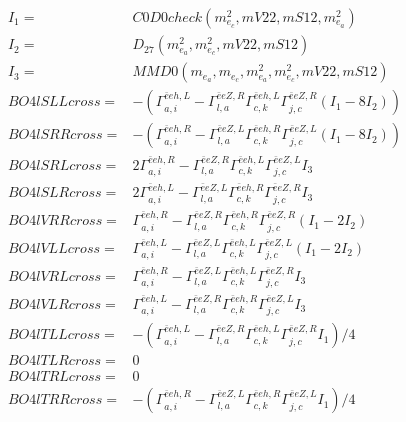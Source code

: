\documentclass[A4,landscape]{article}
\begin{document}
\begin{align} 
I_1 = & C0D0check(m^2_{e_{{c}}}, mV22, mS12, m^2_{e_{{a}}}) \\ 
I_2 = & D_{27}(m^2_{e_{{a}}}, m^2_{e_{{c}}}, mV22, mS12) \\ 
I_3 = & MMD0(m_{e_{{a}}}, m_{e_{{c}}}, m^2_{e_{{a}}}, m^2_{e_{{c}}}, mV22, mS12) \\ 
  BO4lSLLcross= & -( \Gamma^{\bar{e}e h ,L}_{a, i} - \Gamma^{\bar{e}e Z ,R} _{l, a} \Gamma^{\bar{e}e h ,L}_{c, k} \Gamma^{\bar{e}e Z ,R}_{j, c} (I_1 - 8 I_2)) \\ 
  BO4lSRRcross= & -( \Gamma^{\bar{e}e h ,R}_{a, i} - \Gamma^{\bar{e}e Z ,L} _{l, a} \Gamma^{\bar{e}e h ,R}_{c, k} \Gamma^{\bar{e}e Z ,L}_{j, c} (I_1 - 8 I_2)) \\ 
  BO4lSRLcross= & 2  \Gamma^{\bar{e}e h ,R}_{a, i} - \Gamma^{\bar{e}e Z ,R} _{l, a} \Gamma^{\bar{e}e h ,L}_{c, k} \Gamma^{\bar{e}e Z ,L}_{j, c} I_3 \\ 
  BO4lSLRcross= & 2  \Gamma^{\bar{e}e h ,L}_{a, i} - \Gamma^{\bar{e}e Z ,L} _{l, a} \Gamma^{\bar{e}e h ,R}_{c, k} \Gamma^{\bar{e}e Z ,R}_{j, c} I_3 \\ 
  BO4lVRRcross= &  \Gamma^{\bar{e}e h ,R}_{a, i} - \Gamma^{\bar{e}e Z ,R} _{l, a} \Gamma^{\bar{e}e h ,R}_{c, k} \Gamma^{\bar{e}e Z ,R}_{j, c} (I_1 - 2 I_2) \\ 
  BO4lVLLcross= &  \Gamma^{\bar{e}e h ,L}_{a, i} - \Gamma^{\bar{e}e Z ,L} _{l, a} \Gamma^{\bar{e}e h ,L}_{c, k} \Gamma^{\bar{e}e Z ,L}_{j, c} (I_1 - 2 I_2) \\ 
  BO4lVRLcross= &  \Gamma^{\bar{e}e h ,R}_{a, i} - \Gamma^{\bar{e}e Z ,L} _{l, a} \Gamma^{\bar{e}e h ,L}_{c, k} \Gamma^{\bar{e}e Z ,R}_{j, c} I_3 \\ 
  BO4lVLRcross= &  \Gamma^{\bar{e}e h ,L}_{a, i} - \Gamma^{\bar{e}e Z ,R} _{l, a} \Gamma^{\bar{e}e h ,R}_{c, k} \Gamma^{\bar{e}e Z ,L}_{j, c} I_3 \\ 
  BO4lTLLcross= & -( \Gamma^{\bar{e}e h ,L}_{a, i} - \Gamma^{\bar{e}e Z ,R} _{l, a} \Gamma^{\bar{e}e h ,L}_{c, k} \Gamma^{\bar{e}e Z ,R}_{j, c} I_1)/4 \\ 
  BO4lTLRcross= & 0 \\ 
  BO4lTRLcross= & 0 \\ 
  BO4lTRRcross= & -( \Gamma^{\bar{e}e h ,R}_{a, i} - \Gamma^{\bar{e}e Z ,L} _{l, a} \Gamma^{\bar{e}e h ,R}_{c, k} \Gamma^{\bar{e}e Z ,L}_{j, c} I_1)/4 \\ 
\end{align} 
\end{document}
